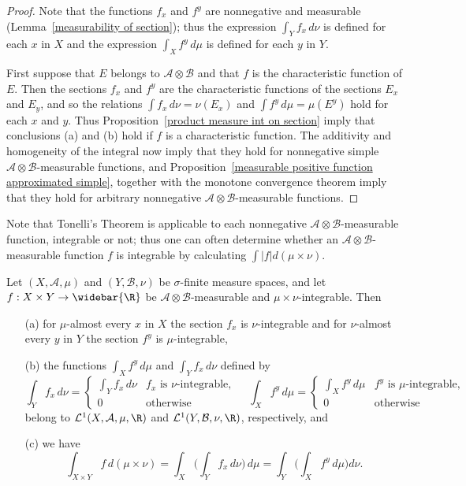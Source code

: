 \begin{proof}
Note that the functions $f_x$ and $f^y$ are nonnegative and measurable (Lemma~\ref{measurability of section}); thus the expression $\int_Yf_x\,d\nu$ is defined for each $x$ in $X$ and the expression $\int_Xf^y\,d\mu$ is defined for each $y$ in $Y$.\par
First suppose that $E$ belongs to $\mathcal{A}\otimes\mathcal{B}$ and that $f$ is the characteristic function of $E$. Then the sections $f_x$ and $f^y$ are the characteristic functions of the sections $E_x$ and $E_y$, and so the relations $\int f_x\,d\nu=\nu(E_x)$ and $\int f^y\,d\mu=\mu(E^y)$ hold for each $x$ and $y$. Thus Proposition~\ref{product measure int on section} imply that conclusions (a) and (b) hold if $f$ is a characteristic function. The additivity and homogeneity of the integral now imply that they hold for nonnegative simple $\mathcal{A}\otimes\mathcal{B}$-measurable functions, and Proposition~\ref{measurable positive function approximated simple}, together with the monotone convergence theorem imply that they hold for arbitrary nonnegative $\mathcal{A}\otimes\mathcal{B}$-measurable functions.
\end{proof}
Note that Tonelli's Theorem is applicable to each nonnegative $\mathcal{A}\otimes\mathcal{B}$-measurable function, integrable or not; thus one can often determine whether an $\mathcal{A}\otimes\mathcal{B}$-measurable function $f$ is integrable by calculating $\int|f|d(\mu\times\nu)$.
\begin{theorem}
Let $(X,\mathcal{A},\mu)$ and $(Y,\mathcal{B},\nu)$ be $\sigma$-finite measure spaces, and let $f:X\times Y\to\widebar{\R}$ be $\mathcal{A}\otimes\mathcal{B}$-measurable and $\mu\times\nu$-integrable. Then
\begin{itemize}
\item[(a)] for $\mu$-almost every $x$ in $X$ the section $f_x$ is $\nu$-integrable and for $\nu$-almost every $y$ in $Y$ the section $f^y$ is $\mu$-integrable,
\item[(b)] the functions $\int_Xf^y\,d\mu$ and $\int_Yf_x\,d\nu$ defined by
\[\int_Yf_x\,d\nu=\begin{cases}
\int_Yf_x\,d\nu&\text{$f_x$ is $\nu$-integrable},\\[8pt]
0&\text{otherwise}
\end{cases}\quad\int_Xf^y\,d\mu=\begin{cases}
\int_Xf^y\,d\mu&\text{$f^y$ is $\mu$-integrable},\\[8pt]
0&\text{otherwise}
\end{cases}\]
belong to $\mathcal{L}^1(X,\mathcal{A},\mu,\R)$ and $\mathcal{L}^1(Y,\mathcal{B},\nu,\R)$, respectively, and
\item[(c)] we have
\[\int_{X\times Y}f\,d(\mu\times\nu)=\int_X\Big(\int_Yf_x\,d\nu\Big)\,d\mu=\int_Y\Big(\int_Xf^y\,d\mu\Big)d\nu.\]
\end{itemize}
\end{theorem}
